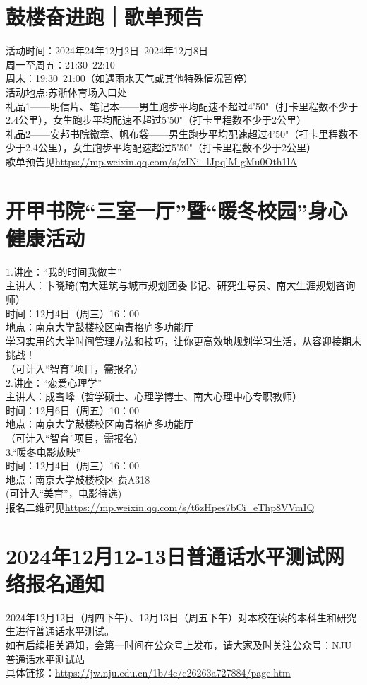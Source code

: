 \documentclass[letterpaper, 12pt]{article}
\begin{document}
\begin{multicols}{2}
\section{鼓楼奋进跑｜歌单预告}
活动时间：2024年24年12月2日~2024年12月8日\\
周一至周五：21:30~22:10\\
周末：19:30~21:00（如遇雨水天气或其他特殊情况暂停）\\
活动地点:苏浙体育场入口处\\
礼品1——明信片、笔记本——男生跑步平均配速不超过4'50"（打卡里程数不少于2.4公里），女生跑步平均配速不超过5'50"（打卡里程数不少于2公里）\\
礼品2——安邦书院徽章、帆布袋——男生跑步平均配速超过4'50"（打卡里程数不少于2.4公里），女生跑步平均配速超过5'50"（打卡里程数不少于2公里）\\
歌单预告见\url{https://mp.weixin.qq.com/s/zINi_lJpqlM-gMu0Oth1lA}

\section{开甲书院“三室一厅”暨“暖冬校园”身心健康活动}
1.讲座：“我的时间我做主”\\
主讲人：卞晓琦(南大建筑与城市规划团委书记、研究生导员、南大生涯规划咨询师）\\
时间：12月4日（周三）16：00\\
地点：南京大学鼓楼校区南青格庐多功能厅\\
学习实用的大学时间管理方法和技巧，让你更高效地规划学习生活，从容迎接期末挑战！\\
（可计入“智育”项目，需报名）\\
2.讲座：“恋爱心理学”\\
主讲人：成雪峰（哲学硕士、心理学博士、南大心理中心专职教师）\\
时间：12月6日（周五）10：00\\
地点：南京大学鼓楼校区南青格庐多功能厅\\
（可计入“智育”项目，需报名）\\
3.“暖冬电影放映”\\
时间：12月4日（周三）16：00\\
地点：南京大学鼓楼校区 费A318\\
(可计入“美育”，电影待选)\\
报名二维码见\url{https://mp.weixin.qq.com/s/t6zHpes7bCi_eThp8VVmIQ}


\section{2024年12月12-13日普通话水平测试网络报名通知}
2024年12月12日（周四下午）、12月13日（周五下午）对本校在读的本科生和研究生进行普通话水平测试。\\
如有后续相关通知，会第一时间在公众号上发布，请大家及时关注公众号：NJU普通话水平测试站\\
具体链接：\url{https://jw.nju.edu.cn/1b/4c/c26263a727884/page.htm}\\


\end{multicols}
\end{document}
